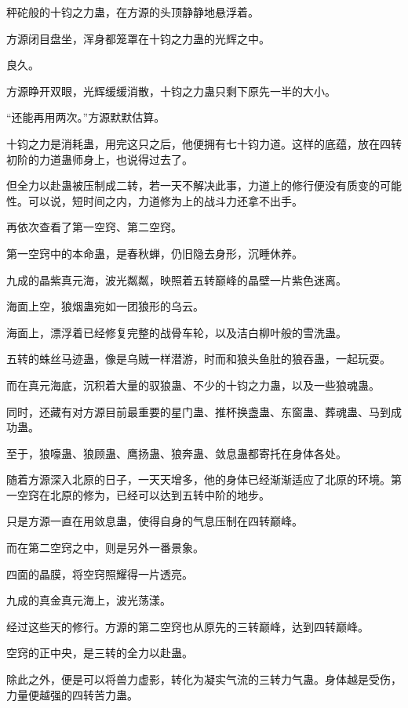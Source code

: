 
\begin{this_body}

秤砣般的十钧之力蛊，在方源的头顶静静地悬浮着。

方源闭目盘坐，浑身都笼罩在十钧之力蛊的光辉之中。

良久。

方源睁开双眼，光辉缓缓消散，十钧之力蛊只剩下原先一半的大小。

“还能再用两次。”方源默默估算。

十钧之力是消耗蛊，用完这只之后，他便拥有七十钧力道。这样的底蕴，放在四转初阶的力道蛊师身上，也说得过去了。

但全力以赴蛊被压制成二转，若一天不解决此事，力道上的修行便没有质变的可能性。可以说，短时间之内，力道修为上的战斗力还拿不出手。

再依次查看了第一空窍、第二空窍。

第一空窍中的本命蛊，是春秋蝉，仍旧隐去身形，沉睡休养。

九成的晶紫真元海，波光粼粼，映照着五转巅峰的晶壁一片紫色迷离。

海面上空，狼烟蛊宛如一团狼形的乌云。

海面上，漂浮着已经修复完整的战骨车轮，以及洁白柳叶般的雪洗蛊。

五转的蛛丝马迹蛊，像是乌贼一样潜游，时而和狼头鱼肚的狼吞蛊，一起玩耍。

而在真元海底，沉积着大量的驭狼蛊、不少的十钧之力蛊，以及一些狼魂蛊。

同时，还藏有对方源目前最重要的星门蛊、推杯换盏蛊、东窗蛊、葬魂蛊、马到成功蛊。

至于，狼嚎蛊、狼顾蛊、鹰扬蛊、狼奔蛊、敛息蛊都寄托在身体各处。

随着方源深入北原的日子，一天天增多，他的身体已经渐渐适应了北原的环境。第一空窍在北原的修为，已经可以达到五转中阶的地步。

只是方源一直在用敛息蛊，使得自身的气息压制在四转巅峰。

而在第二空窍之中，则是另外一番景象。

四面的晶膜，将空窍照耀得一片透亮。

九成的真金真元海上，波光荡漾。

经过这些天的修行。方源的第二空窍也从原先的三转巅峰，达到四转巅峰。

空窍的正中央，是三转的全力以赴蛊。

除此之外，便是可以将兽力虚影，转化为凝实气流的三转力气蛊。身体越是受伤，力量便越强的四转苦力蛊。


\end{this_body}

